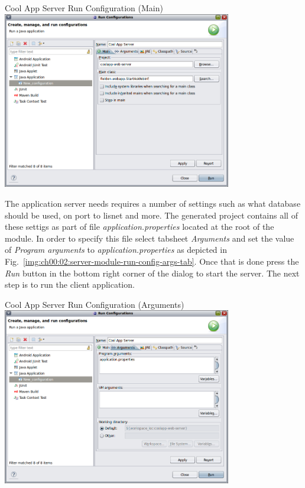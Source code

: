   \begin{image}{Cool App Server Run Configuration (Main)}{\label{img:ch00:02:server-module-run-config-main-tab}}    
    \includegraphics[width=0.75\textwidth]{parts/00-part/chapters/01-application-modules/images/13-server-module-run-config-main-tab.png}
  \end{image}

  The application server needs requires a number of settings such as what database should be used, on port to lisnet and more.
  The generated project contains all of these settigs as part of file \emph{application.properties} located at the root of the module.
  In order to specify this file select tabsheet \emph{Arguments} and set the value of \emph{Program arguments} to \emph{application.properties} as depicted in Fig.~\ref{img:ch00:02:server-module-run-config-args-tab}.
  Once that is done press the \emph{Run} button in the bottom right corner of the dialog to start the server.
  The next step is to run the client application.

  \begin{image}{Cool App Server Run Configuration (Arguments)}{\label{img:ch00:02:server-module-run-config-args-tab}}    
    \includegraphics[width=0.75\textwidth]{parts/00-part/chapters/01-application-modules/images/14-server-module-run-config-arguments-tab.png}
  \end{image}
  

